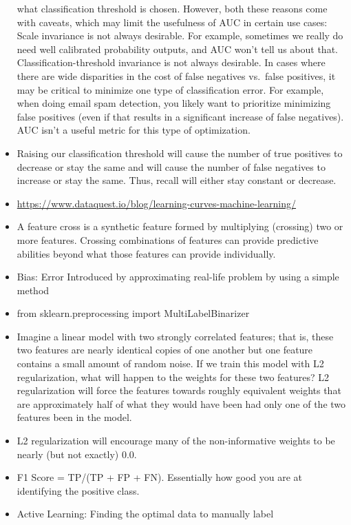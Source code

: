 \documentclass[]{book}
\theoremstyle{definition}
\theoremstyle{definition}
\theoremstyle{definition}
\theoremstyle{remark}
\begin{document}
\begin{itemize}
  what classification threshold is chosen. However, both these reasons
  come with caveats, which may limit the usefulness of AUC in certain
  use cases: Scale invariance is not always desirable. For example,
  sometimes we really do need well calibrated probability outputs, and
  AUC won't tell us about that. Classification-threshold invariance is
  not always desirable. In cases where there are wide disparities in the
  cost of false negatives vs.~false positives, it may be critical to
  minimize one type of classification error. For example, when doing
  email spam detection, you likely want to prioritize minimizing false
  positives (even if that results in a significant increase of false
  negatives). AUC isn't a useful metric for this type of optimization.
\item
  Raising our classification threshold will cause the number of true
  positives to decrease or stay the same and will cause the number of
  false negatives to increase or stay the same. Thus, recall will either
  stay constant or decrease.
\item
  \url{https://www.dataquest.io/blog/learning-curves-machine-learning/}
\item
  A feature cross is a synthetic feature formed by multiplying
  (crossing) two or more features. Crossing combinations of features can
  provide predictive abilities beyond what those features can provide
  individually.
\item
  Bias: Error Introduced by approximating real-life problem by using a
  simple method
\item
  from sklearn.preprocessing import MultiLabelBinarizer
\item
  Imagine a linear model with two strongly correlated features; that is,
  these two features are nearly identical copies of one another but one
  feature contains a small amount of random noise. If we train this
  model with L2 regularization, what will happen to the weights for
  these two features? L2 regularization will force the features towards
  roughly equivalent weights that are approximately half of what they
  would have been had only one of the two features been in the model.
\item
  L2 regularization will encourage many of the non-informative weights
  to be nearly (but not exactly) 0.0.
\item
  F1 Score = TP/(TP + FP + FN). Essentially how good you are at
  identifying the positive class.
\item
  Active Learning: Finding the optimal data to manually label

\end{itemize}
\end{document}
